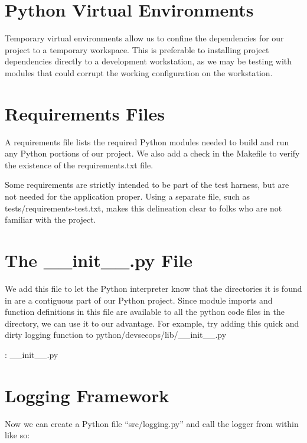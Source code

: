 \section{Python Virtual Environments}

\justifying
Temporary virtual environments allow us to confine the dependencies for our project to a temporary workspace.
This is preferable to installing project dependencies directly to a development workstation, as we may be
testing with modules that could corrupt the working configuration on the workstation.

\section{Requirements Files}

\justifying
A requirements file lists the required Python modules needed to build and run any Python portions of our
project. We also add a check in the Makefile to verify the existence of the requirements.txt file.

\justifying
Some requirements are strictly intended to be part of the test harness, but are not needed for the application
proper. Using a separate file, such as tests/requirements-test.txt, makes this delineation clear to folks who are not familiar with the project.


\section{The \_\_init\_\_.py File}

\justifying
We add this file to let the Python interpreter know that the directories it is found in are a contiguous part
of our Python project. Since module imports and function definitions in this file are available to all the
python code files in the directory, we can use it to our advantage. For example, try adding this quick and
dirty logging function to python/devsecops/lib/\_\_init\_\_.py

\justifying
\begin{mybox}{\thetcbcounter: \_\_init\_\_.py}
  
\end{mybox}

\section{Logging Framework}
\justifying
Now we can create a Python file ``src/logging.py'' and call the logger from within like so:

